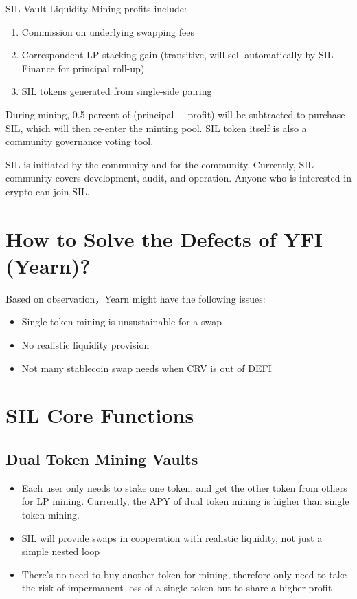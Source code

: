 \documentclass[11pt,letterpaper]{article}
\begin{document}
\begin{multicols}{2}
SIL Vault Liquidity Mining profits include:
\begin{enumerate}
    \item Commission on underlying swapping fees
    \item Correspondent LP stacking gain (transitive, will sell automatically by SIL Finance for principal roll-up)
    \item SIL tokens generated from single-side pairing
\end{enumerate}
During mining, 0.5 percent of (principal + profit) will be subtracted to purchase SIL, which will then re-enter the minting pool. SIL token itself is also a community governance voting tool.

SIL is initiated by the community and for the community. Currently, SIL community covers development, audit, and operation. Anyone who is interested in crypto can join SIL.

\section{How to Solve the Defects of YFI (Yearn)? }
Based on observation，Yearn might have the following issues:

\begin{itemize}
  \item Single token mining is unsustainable for a swap
  \item No realistic liquidity provision
  \item Not many stablecoin swap needs when CRV is out of DEFI
\end{itemize}

\section{SIL Core Functions}

\subsection{Dual Token Mining Vaults}
\begin{itemize}
  \item Each user only needs to stake one token, and get the other token from others for LP mining. Currently, the APY of dual token mining is higher than single token mining.
  \item SIL will provide swaps in cooperation with realistic liquidity, not just a simple nested loop
  \item There's no need to buy another token for mining, therefore only need to take the risk of impermanent loss of a single token but to share a higher profit
\end{itemize}


\end{multicols}
\end{document}
